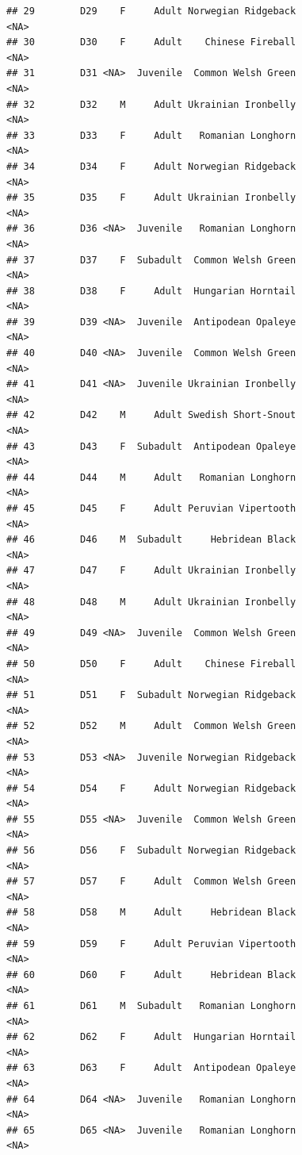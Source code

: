 \documentclass[
]{book}
\begin{document}
\begin{verbatim}
## 29        D29    F     Adult Norwegian Ridgeback                <NA>
## 30        D30    F     Adult    Chinese Fireball                <NA>
## 31        D31 <NA>  Juvenile  Common Welsh Green                <NA>
## 32        D32    M     Adult Ukrainian Ironbelly                <NA>
## 33        D33    F     Adult   Romanian Longhorn                <NA>
## 34        D34    F     Adult Norwegian Ridgeback                <NA>
## 35        D35    F     Adult Ukrainian Ironbelly                <NA>
## 36        D36 <NA>  Juvenile   Romanian Longhorn                <NA>
## 37        D37    F  Subadult  Common Welsh Green                <NA>
## 38        D38    F     Adult  Hungarian Horntail                <NA>
## 39        D39 <NA>  Juvenile  Antipodean Opaleye                <NA>
## 40        D40 <NA>  Juvenile  Common Welsh Green                <NA>
## 41        D41 <NA>  Juvenile Ukrainian Ironbelly                <NA>
## 42        D42    M     Adult Swedish Short-Snout                <NA>
## 43        D43    F  Subadult  Antipodean Opaleye                <NA>
## 44        D44    M     Adult   Romanian Longhorn                <NA>
## 45        D45    F     Adult Peruvian Vipertooth                <NA>
## 46        D46    M  Subadult     Hebridean Black                <NA>
## 47        D47    F     Adult Ukrainian Ironbelly                <NA>
## 48        D48    M     Adult Ukrainian Ironbelly                <NA>
## 49        D49 <NA>  Juvenile  Common Welsh Green                <NA>
## 50        D50    F     Adult    Chinese Fireball                <NA>
## 51        D51    F  Subadult Norwegian Ridgeback                <NA>
## 52        D52    M     Adult  Common Welsh Green                <NA>
## 53        D53 <NA>  Juvenile Norwegian Ridgeback                <NA>
## 54        D54    F     Adult Norwegian Ridgeback                <NA>
## 55        D55 <NA>  Juvenile  Common Welsh Green                <NA>
## 56        D56    F  Subadult Norwegian Ridgeback                <NA>
## 57        D57    F     Adult  Common Welsh Green                <NA>
## 58        D58    M     Adult     Hebridean Black                <NA>
## 59        D59    F     Adult Peruvian Vipertooth                <NA>
## 60        D60    F     Adult     Hebridean Black                <NA>
## 61        D61    M  Subadult   Romanian Longhorn                <NA>
## 62        D62    F     Adult  Hungarian Horntail                <NA>
## 63        D63    F     Adult  Antipodean Opaleye                <NA>
## 64        D64 <NA>  Juvenile   Romanian Longhorn                <NA>
## 65        D65 <NA>  Juvenile   Romanian Longhorn                <NA>

\end{verbatim}
\end{document}
